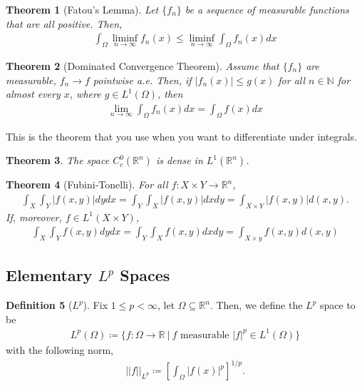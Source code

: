 \documentclass[psamsfonts]{amsart}
\newcommand{\given}{\ |\ }
\newtheorem{thm}{Theorem}[section]
\theoremstyle{definition}
\newtheorem{defn}[thm]{Definition}
\theoremstyle{remark}
\newcommand{\N}[0]{\mathbb{N}}
\newcommand{\R}[0]{\mathbb{R}}
\numberwithin{equation}{section}
\begin{document}
\begin{thm}[Fatou's Lemma]
	Let \( \{ f_n \} \) be a sequence of measurable functions that are all positive. Then, 
	\begin{align}
		\boxed{\int_{\Omega} \liminf_{n \rightarrow \infty} f_n(x) \leq \liminf_{n \rightarrow \infty} \int_\Omega f_n(x) dx}	
	\end{align}
\end{thm}

\begin{thm}[Dominated Convergence Theorem]
		Assume that \( \{ f_n \} \) are measurable, \( f_n \rightarrow f \) pointwise a.e. Then, if \( |f_n(x)| \leq g(x) \) for all \( n \in \N \) for almost every \( x \), where \( g \in L^1(\Omega) \), then
		\begin{align}
			\boxed{\lim_{n \rightarrow \infty} \int_\Omega f_n(x) dx = \int_\Omega f(x) dx}	
		\end{align}
\end{thm}
This is the theorem that you use when you want to differentiate under integrals.

\begin{thm}
	The space \( C_c^0(\R^n ) \) is dense in \( L^1(\R^n) \).	
\end{thm}

\begin{thm}[Fubini-Tonelli] 
	For all \( f: X \times Y \to \R^n \), 
	\begin{align}
		\boxed{\int_X \int_Y | f(x,y)| dy dx = \int_Y \int_X |f(x,y)|dx dy = \int_{X \times Y } |f(x,y)| d(x,y).} 
	\end{align}
	If, moreover, \( f \in L^1(X \times Y) \), 
	\begin{align}
		\int_X \int_Y f(x, y) dy dx = \int_Y \int_X f(x, y) dx dy = \int_{X \times y} f(x,y) d(x,y) 	
	\end{align}
\end{thm}

\subsection{Elementary \( L^p \) Spaces}

\begin{defn}[\(L^p \)] 
		Fix \( 1 \leq p < \infty \), let \( \Omega \subseteq \R^n \). Then, we define the \(L^p\) space to be
		\begin{align}
			\boxed{L^p(\Omega) \coloneqq \{ f: \Omega \to \R \given f \text{ measurable } |f|^p \in L^1(\Omega) \}}
		\end{align}
		with the following norm, 
		\begin{align}
			|| f ||_{L^p} \coloneqq \left[ \int_{\Omega} |f(x)|^p \right]^{1/p}.	
		\end{align}
\end{defn}
\end{document}
